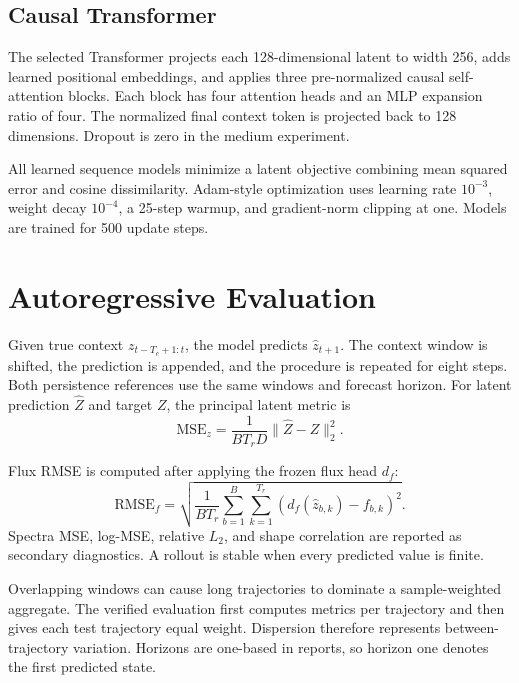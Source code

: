 \subsection{Causal Transformer}

The selected Transformer projects each 128-dimensional latent to width 256, adds learned positional
embeddings, and applies three pre-normalized causal self-attention blocks. Each block has four
attention heads and an MLP expansion ratio of four. The normalized final context token is projected
back to 128 dimensions. Dropout is zero in the medium experiment.

All learned sequence models minimize a latent objective combining mean squared error and cosine
dissimilarity. Adam-style optimization uses learning rate $10^{-3}$, weight decay $10^{-4}$, a
25-step warmup, and gradient-norm clipping at one. Models are trained for 500 update steps.

\section{Autoregressive Evaluation}

Given true context $z_{t-T_c+1:t}$, the model predicts $\hat z_{t+1}$. The context window is shifted,
the prediction is appended, and the procedure is repeated for eight steps. Both persistence
references use the same windows and forecast horizon. For latent prediction $\hat Z$ and target $Z$, the principal
latent metric is
\begin{equation}
  \mathrm{MSE}_{z}=\frac{1}{BT_rD}\lVert \hat Z-Z\rVert_2^2.
\end{equation}

Flux RMSE is computed after applying the frozen flux head $d_f$:
\begin{equation}
  \mathrm{RMSE}_{f}=\sqrt{\frac{1}{BT_r}\sum_{b=1}^{B}\sum_{k=1}^{T_r}
  \left(d_f(\hat z_{b,k})-f_{b,k}\right)^2}.
\end{equation}
Spectra MSE, log-MSE, relative $L_2$, and shape correlation are reported as secondary diagnostics.
A rollout is stable when every predicted value is finite.

Overlapping windows can cause long trajectories to dominate a sample-weighted aggregate. The
verified evaluation first computes metrics per trajectory and then gives each test trajectory equal
weight. Dispersion therefore represents between-trajectory variation. Horizons are one-based in
reports, so horizon one denotes the first predicted state.
